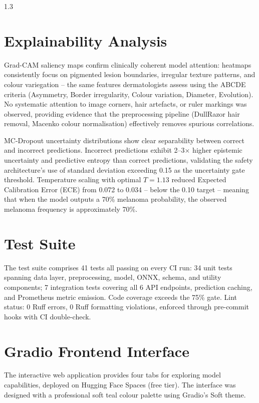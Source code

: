 \begin{spacing}{1.3}
\section{Explainability Analysis}

Grad-CAM saliency maps confirm clinically coherent model attention: heatmaps consistently focus on pigmented lesion boundaries, irregular texture patterns, and colour variegation -- the same features dermatologists assess using the ABCDE criteria (Asymmetry, Border irregularity, Colour variation, Diameter, Evolution). No systematic attention to image corners, hair artefacts, or ruler markings was observed, providing evidence that the preprocessing pipeline (DullRazor hair removal, Macenko colour normalisation) effectively removes spurious correlations.

MC-Dropout uncertainty distributions show clear separability between correct and incorrect predictions. Incorrect predictions exhibit 2--3$\times$ higher epistemic uncertainty and predictive entropy than correct predictions, validating the safety architecture's use of standard deviation exceeding 0.15 as the uncertainty gate threshold. Temperature scaling with optimal $T = 1.13$ reduced Expected Calibration Error (ECE) from 0.072 to 0.034 -- below the 0.10 target -- meaning that when the model outputs a 70\% melanoma probability, the observed melanoma frequency is approximately 70\%.

\section{Test Suite}

The test suite comprises 41 tests all passing on every CI run: 34 unit tests spanning data layer, preprocessing, model, ONNX, schema, and utility components; 7 integration tests covering all 6 API endpoints, prediction caching, and Prometheus metric emission. Code coverage exceeds the 75\% gate. Lint status: 0 Ruff errors, 0 Ruff formatting violations, enforced through pre-commit hooks with CI double-check.

\section{Gradio Frontend Interface}

\label{sec:gradio}
The interactive web application provides four tabs for exploring model capabilities, deployed on Hugging Face Spaces (free tier). The interface was designed with a professional soft teal colour palette using Gradio's Soft theme.


\end{spacing}
